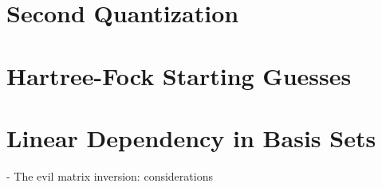\appendix
\chapter{Second Quantization}

\chapter{Hartree-Fock Starting Guesses \label{sec:SCFGUESS}}

\chapter{Linear Dependency in Basis Sets \label{sec:LINDEP}}

- The evil matrix inversion: considerations
